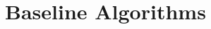 \documentclass          {article} %
\begin{document}


               \section {Baseline Algorithms}
               \label   {sec:baseline_algorithms}
\end{document}
